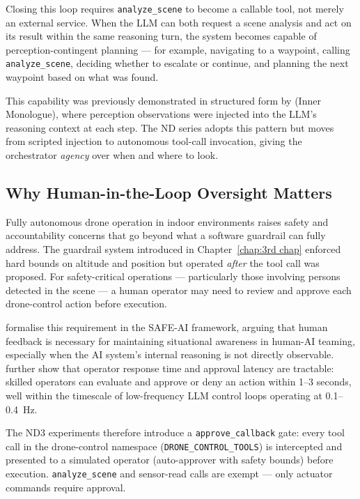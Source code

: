 Closing this loop requires \texttt{analyze\_scene} to become a callable tool, not merely an
external service.  When the LLM can both request a scene analysis and act on its result
within the same reasoning turn, the system becomes capable of perception-contingent
planning --- for example, navigating to a waypoint, calling \texttt{analyze\_scene}, deciding
whether to escalate or continue, and planning the next waypoint based on what was found.

This capability was previously demonstrated in structured form by \citet{huang2022innermonologue}
(Inner Monologue), where perception observations were injected into the LLM's reasoning
context at each step.  The ND series adopts this pattern but moves from scripted injection
to autonomous tool-call invocation, giving the orchestrator \emph{agency} over when and
where to look.

\subsection{Why Human-in-the-Loop Oversight Matters}
\label{sec:ch4_problem_hitl}

Fully autonomous drone operation in indoor environments raises safety and accountability
concerns that go beyond what a software guardrail can fully address.  The guardrail system
introduced in Chapter~\ref{chap:3rd chap} enforced hard bounds on altitude and position
but operated \emph{after} the tool call was proposed.  For safety-critical operations ---
particularly those involving persons detected in the scene --- a human operator may need to
review and approve each drone-control action before execution.

\citet{sanneman2022safeai} formalise this requirement in the SAFE-AI framework, arguing that
human feedback is necessary for maintaining situational awareness in human-AI teaming,
especially when the AI system's internal reasoning is not directly observable.
\citet{chen2018humanperformance} further show that operator response time and approval latency
are tractable: skilled operators can evaluate and approve or deny an action within 1--3
seconds, well within the timescale of low-frequency LLM control loops operating at
0.1--0.4~Hz.

The ND3 experiments therefore introduce a \texttt{approve\_callback} gate: every tool call
in the drone-control namespace (\texttt{DRONE\_CONTROL\_TOOLS}) is intercepted and presented
to a simulated operator (auto-approver with safety bounds) before execution.
\texttt{analyze\_scene} and sensor-read calls are exempt --- only actuator commands require
approval.


